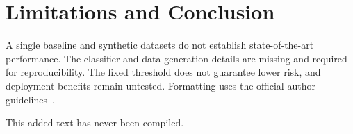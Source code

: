 \section{Limitations and Conclusion}
A single baseline and synthetic datasets do not establish state-of-the-art
performance. The classifier and data-generation details are
missing and required for reproducibility. The fixed threshold does not
guarantee lower risk, and deployment benefits remain untested.
Formatting uses the official author guidelines~\cite{formatguide}.
\label{pw:main-end}

This added text has never been compiled.

